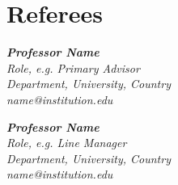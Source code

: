\section{Referees}
\noindent
\begin{minipage}[t]{0.48\textwidth}
\textbf{\textit{Professor Name}} \\
\textit{Role, e.g. Primary Advisor} \\
\textit{Department, University, Country} \\
\textit{name@institution.edu}
\end{minipage}%
\hfill
\begin{minipage}[t]{0.48\textwidth}
\textbf{\textit{Professor Name}} \\
\textit{Role, e.g. Line Manager} \\
\textit{Department, University, Country} \\
\textit{name@institution.edu}
\end{minipage}
\vspace{4pt}
